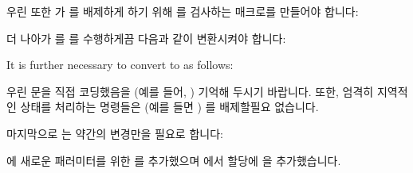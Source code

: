 \fi



우린 또한  가  를 배제하게 하기 위해
 를 검사하는  매크로를 만들어야 합니다:

\iffalse

We will also need to introduce an \co{EXECUTE_IRQ()}
macro that checks \co{in_dyntick_nmi} in order to allow
\co{dyntick_irq()} to exclude \co{dyntick_nmi()}:

\fi



더 나아가  를  를 수행하게끔 다음과 같이
변환시켜야 합니다:

It is further necessary to convert 
to  as follows:



\begin{fcvref}
우린  문을 직접 코딩했음을 (예를 들어, )
기억해 두시기 바랍니다.
또한, 엄격히 지역적인 상태를 처리하는 명령들은 (예를 들면 )
 를 배제할필요 없습니다.
\end{fcvref}

마지막으로  는 약간의 변경만을 필요로 합니다:

\iffalse

\begin{fcvref}[ln:formal:promela:dyntick:dyntickRCU-irq-nmi-ssl:dyntick_irq]
Note that we have open-coded the \qco{if} statements
(for example, \clnrefrange{stmt1:b}{stmt1:e}).
In addition, statements that process strictly local state
(such as \clnref{inc_i}) need not exclude \co{dyntick_nmi()}.
\end{fcvref}

Finally, \co{grace_period()} requires only a few changes:

\fi



\begin{fcvref}
 에 새로운  패러미터를 위한
 를 추가했으며  에서 
할당에  을 추가했습니다.
\end{fcvref}

